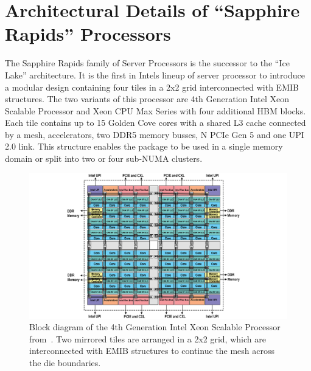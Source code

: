 \chapter{Architectural Details of ``Sapphire Rapids'' Processors}
The Sapphire Rapids family of Server Processors is the successor to the ``Ice Lake'' architecture.
It is the first in Intels lineup of server processor to introduce a modular design containing four tiles in a 2x2 grid interconnected with EMIB structures.
The two variants of this processor are 4th Generation Intel Xeon Scalable Processor and Xeon CPU Max Series with four additional HBM blocks.~\cite{Intel_2021_Hotchips}
Each tile contains up to 15 Golden Cove cores with a shared L3 cache connected by a mesh, accelerators, two DDR5 memory busses, N PCIe Gen 5 and one UPI 2.0 link.
This structure enables the package to be used in a single memory domain or split into two or four sub-NUMA clusters.~\cite{Intel_4th_gen_scalable}


\begin{figure}[]
    \centering
    \includegraphics[width=\columnwidth]{fig/spr-uma.png}
    \caption{Block diagram of the 4th Generation Intel Xeon Scalable Processor from~\cite{Intel_4th_gen_scalable}.
Two mirrored tiles are arranged in a 2x2 grid, which are interconnected with EMIB structures to continue the mesh across the die boundaries.~\cite{Intel_2022_ISSCC}}
\end{figure}



